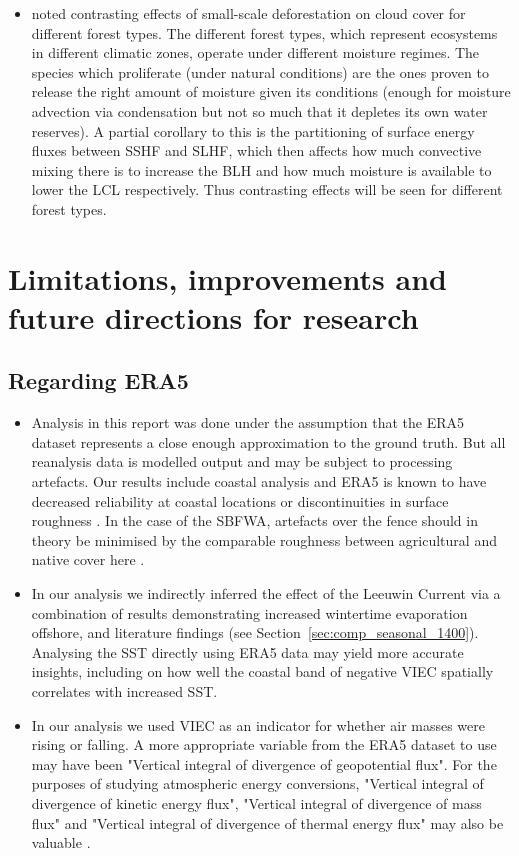 \begin{itemize}
	\item \citet{xu2022} noted contrasting effects of small-scale deforestation on cloud cover for different forest types. The different forest types, which represent ecosystems in different climatic zones, operate under different moisture regimes. The species which proliferate (under natural conditions) are the ones proven to release the right amount of moisture given its conditions (enough for moisture advection via condensation but not so much that it depletes its own water reserves). A partial corollary to this is the partitioning of surface energy fluxes between \ac{SSHF} and \ac{SLHF}, which then affects how much convective mixing there is to increase the \ac{BLH} and how much moisture is available to lower the \ac{LCL} respectively. Thus contrasting effects will be seen for different forest types.
\end{itemize}

\section[Limitations, improvements and future directions]{Limitations, improvements and future directions for research}

\subsection{Regarding ERA5}
\label{ssec:era5_improve}

\begin{itemize}
	\item Analysis in this report was done under the assumption that the \ac{ERA5} dataset represents a close enough approximation to the ground truth. But all reanalysis data is modelled output and may be subject to processing artefacts. Our results include coastal analysis and \ac{ERA5} is known to have decreased reliability at coastal locations or discontinuities in surface roughness \citep{gualtieri2021}. In the case of the \ac{SBFWA}, artefacts over the fence should in theory be minimised by the comparable roughness between agricultural and native cover here \citep{lyons2001}.
	\item In our analysis we indirectly inferred the effect of the Leeuwin Current via a combination of results demonstrating increased wintertime evaporation offshore, and literature findings (see Section~\ref{sec:comp_seasonal_1400}). Analysing the \ac{SST} directly using ERA5 data may yield more accurate insights, including on how well the coastal band of negative \ac{VIEC} spatially correlates with increased \ac{SST}.
	\item In our analysis we used \ac{VIEC} as an indicator for whether air masses were rising or falling. A more appropriate variable from the \ac{ERA5} dataset to use may have been "Vertical integral of divergence of geopotential flux". For the purposes of studying atmospheric energy conversions, "Vertical integral of divergence of kinetic energy flux", "Vertical integral of divergence of mass flux" and "Vertical integral of divergence of thermal energy flux" may also be valuable \citep{era5}.
\end{itemize}

